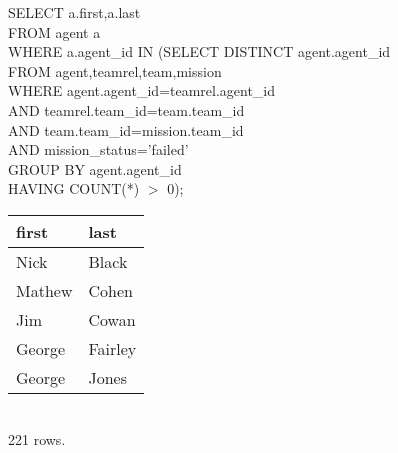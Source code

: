 \documentclass{article}
\begin{document}
\begin{enumerate}
SELECT a.first,a.last\\
FROM agent a\\
WHERE a.agent\_id IN (SELECT DISTINCT agent.agent\_id\\
\hspace*{4 cm}        FROM agent,teamrel,team,mission\\
\hspace*{4 cm}        WHERE agent.agent\_id=teamrel.agent\_id\\
\hspace*{4 cm}        AND teamrel.team\_id=team.team\_id\\
\hspace*{4 cm}        AND team.team\_id=mission.team\_id\\
\hspace*{4 cm}        AND mission\_status='failed'\\
\hspace*{4 cm}        GROUP BY agent.agent\_id\\
\hspace*{4 cm}        HAVING COUNT(*) $>$ 0);\\
\begin{tabular}{l|l}
   first   &      last\\       
\hline
 Nick      & Black\\
 Mathew    & Cohen\\
 Jim       & Cowan\\
 George    & Fairley\\
 George    & Jones\\
\end{tabular}
\\221 rows.\\

\pagebreak


\end{enumerate}
\end{document}
